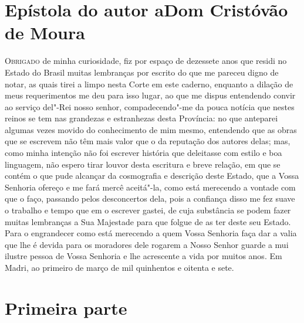 \chapter[Epístola do autor a Dom Cristóvão de Moura]{Epístola do autor a\break Dom
Cristóvão de Moura}

\begin{linenumbers}

\textsc{Obrigado} de minha curiosidade, fiz por espaço de dezessete anos que residi no
Estado do Brasil muitas lembranças por escrito do que me pareceu digno de notar, as quais
tirei a limpo nesta Corte em este caderno, enquanto a dilação de meus requerimentos me deu
para isso lugar, ao que me dispus entendendo convir ao serviço del"-Rei nosso senhor,
compadecendo"-me da pouca notícia que nestes reinos se tem nas grandezas e estranhezas
desta Província: no que anteparei algumas vezes movido do conhecimento de mim mesmo,
entendendo que as obras que se escrevem não têm mais valor que o da reputação dos autores
delas; mas, como minha intenção não foi escrever história que deleitasse com estilo e boa
linguagem, não espero tirar louvor desta escritura e breve relação, em que se contém o que
pude alcançar da cosmografia e descrição deste Estado, que a Vossa Senhoria ofereço e me
fará mercê aceitá"-la, como está merecendo a vontade com que o faço, passando pelos
desconcertos dela, pois a confiança disso me fez suave o trabalho e tempo que em o
escrever gastei, de cuja substância se podem fazer muitas lembranças a Sua Majestade para
que folgue de as ter deste seu Estado. Para o engrandecer como está merecendo a quem Vossa
Senhoria faça dar a valia que lhe é devida para os moradores dele rogarem a Nosso Senhor
guarde a mui ilustre pessoa de Vossa Senhoria e lhe acrescente a vida por muitos anos. Em
Madri, ao primeiro de março de mil quinhentos e oitenta e sete.

\end{linenumbers}

\chapter[Primeira parte: Roteiro geral]{Primeira parte }

